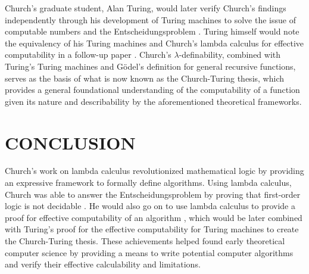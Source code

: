 \documentclass[letterpaper, 10 pt, conference]{ieeeconf}  %
\begin{document}
Church's graduate student, Alan Turing, would later verify Church's findings independently through his development of Turing machines to solve the issue of computable numbers and the Entscheidungsproblem \cite{Turing1}. Turing himself would note the equivalency of his Turing machines and Church's lambda calculus for effective computability in a follow-up paper \cite{Turing2}. Church's $\lambda$-definability, combined with Turing's Turing machines and Gödel's definition for general recursive functions, serves as the basis of what is now known as the Church-Turing thesis, which provides a general foundational understanding of the computability of a function given its nature and describability by the aforementioned theoretical frameworks.

\section{CONCLUSION}

Church's work on lambda calculus revolutionized mathematical logic by providing an expressive framework to formally define algorithms. Using lambda calculus, Church was able to answer the Entscheidungsproblem by proving that first-order logic is not decidable \cite{Church3}. He would also go on to use lambda calculus to provide a proof for effective computability of an algorithm \cite{Church4}, which would be later combined with Turing's proof for the effective computability for Turing machines to create the Church-Turing thesis. These achievements helped found early theoretical computer science by providing a means to write potential computer algorithms and verify their effective calculability and limitations.
\end{document}
